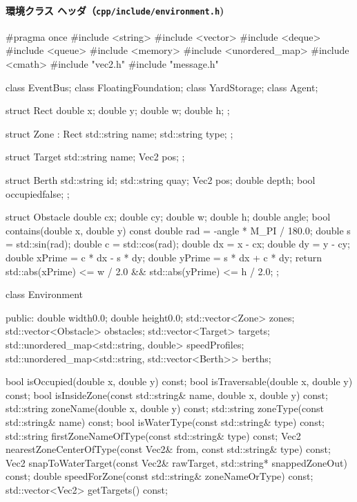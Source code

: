\documentclass[10pt,letterpaper]{jsarticle}
\begin{document}
\paragraph{環境クラス ヘッダ（\texttt{cpp/include/environment.h})}
\begin{cppcode}
#pragma once
#include <string>
#include <vector>
#include <deque>
#include <queue>
#include <memory>
#include <unordered_map>
#include <cmath>
#include "vec2.h"
#include "message.h"

class EventBus;
class FloatingFoundation;
class YardStorage;
class Agent;

struct Rect {
    double x;
    double y;
    double w;
    double h;
};

struct Zone : Rect {
    std::string name;
    std::string type;
};

struct Target {
    std::string name;
    Vec2 pos;
};

struct Berth {
    std::string id;
    std::string quay;
    Vec2 pos;
    double depth;
    bool occupied{false};
};

struct Obstacle {
    double cx;
    double cy;
    double w;
    double h;
    double angle;
    bool contains(double x, double y) const {
        double rad = -angle * M_PI / 180.0;
        double s = std::sin(rad);
        double c = std::cos(rad);
        double dx = x - cx;
        double dy = y - cy;
        double xPrime = c * dx - s * dy;
        double yPrime = s * dx + c * dy;
        return std::abs(xPrime) <= w / 2.0 && std::abs(yPrime) <= h / 2.0;
    }
};

class Environment {
public:
    double width{0.0};
    double height{0.0};
    std::vector<Zone> zones;
    std::vector<Obstacle> obstacles;
    std::vector<Target> targets;
    std::unordered_map<std::string, double> speedProfiles;
    std::unordered_map<std::string, std::vector<Berth>> berths;

    bool isOccupied(double x, double y) const;
    bool isTraversable(double x, double y) const;
    bool isInsideZone(const std::string& name, double x, double y) const;
    std::string zoneName(double x, double y) const;
    std::string zoneType(const std::string& name) const;
    bool isWaterType(const std::string& type) const;
    std::string firstZoneNameOfType(const std::string& type) const;
    Vec2 nearestZoneCenterOfType(const Vec2& from, const std::string& type) const;
    Vec2 snapToWaterTarget(const Vec2& rawTarget, std::string* snappedZoneOut) const;
    double speedForZone(const std::string& zoneNameOrType) const;
    std::vector<Vec2> getTargets() const;

}
\end{cppcode}
\end{document}
